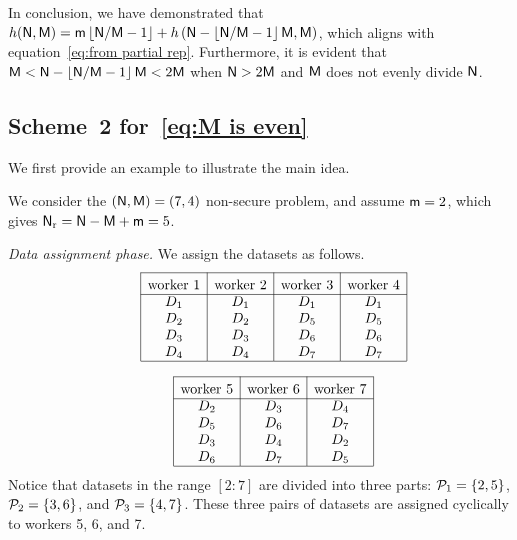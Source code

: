 \documentclass[conference,letterpaper]{IEEEtran}
\begin{document}
In conclusion, we have demonstrated that $h({\sf N}, {\sf M}) = {\sf m}\left\lfloor {\sf N}/{\sf M} - 1 \right\rfloor + h\left({\sf N} - \left\lfloor {\sf N}/{\sf M} - 1 \right\rfloor {\sf M}, {\sf M} \right)$, which aligns with equation~\eqref{eq:from partial rep}. 
Furthermore, it is evident that ${\sf M} < {\sf N} - \left\lfloor {\sf N}/{\sf M} - 1 \right\rfloor {\sf M} < 2{\sf M}$ when ${\sf N} > 2{\sf M}$ and ${\sf M}$ does not evenly divide ${\sf N}$.

 
 
\subsection{\texorpdfstring{Scheme~2 for~\eqref{eq:M is even}}{Scheme 2 for Eq. (X)}}

\label{sub:M is even}
We first provide an example to illustrate the main idea.
\begin{example}
\label{ex:scheme 2 example}
We consider the $({\sf N},{\sf M})=(7,4)$ non-secure problem, and assume ${\sf m} = 2$, which gives ${\sf N}_{\rm r} = {\sf N} - {\sf M} + {\sf m} = 5$.    

{\it Data assignment phase.}
We assign the datasets as follows.  
\begin{align*}
\begin{array}{rl|c|c|c|c|}\cline{3-3}\cline{4-4}\cline{5-5}\cline{6-6}
&&\rule{0pt}{1.2em}\mbox{worker 1}  &\rule{0pt}{1.2em}\mbox{worker 2}  & \rule{0pt}{1.2em}\mbox{worker 3} & \rule{0pt}{1.2em}\mbox{worker 4}  \\ \cline{3-3}\cline{4-4}\cline{5-5}\cline{6-6}
&& D_1& D_1    & D_1 & D_1    \\
&& D_2&  D_2   & D_5  & D_5    \\ 
&& D_3&  D_3    &D_6  & D_6   \\
&& D_4& D_4  & D_7   & D_7   \\ 
\cline{3-3}\cline{4-4}\cline{5-5}\cline{6-6}
\end{array}
\end{align*}

\begin{align*}
\begin{array}{rl|c|c|c|}\cline{3-3}\cline{4-4}\cline{5-5}
&&\rule{0pt}{1.2em}\mbox{worker 5} & \rule{0pt}{1.2em}\mbox{worker 6}    & \rule{0pt}{1.2em}\mbox{worker 7} \\ \cline{3-3}\cline{4-4}\cline{5-5}
&&D_2  & D_3  & D_4 \\
&&D_5   & D_6 & D_7 \\ 
&& D_3  & D_4  & D_2 \\
&& D_6   & D_7  & D_5 \\ 
\cline{3-3}\cline{4-4}\cline{5-5}
\end{array}
\end{align*}
 Notice that datasets in the range $[2:7]$ are divided into three parts: ${\cal P}_1 = \{2, 5\}$, ${\cal P}_2 = \{3, 6\}$, and ${\cal P}_3 = \{4, 7\}$. These three pairs of datasets are assigned cyclically to workers 5, 6, and 7.


\end{example}
\end{document}
